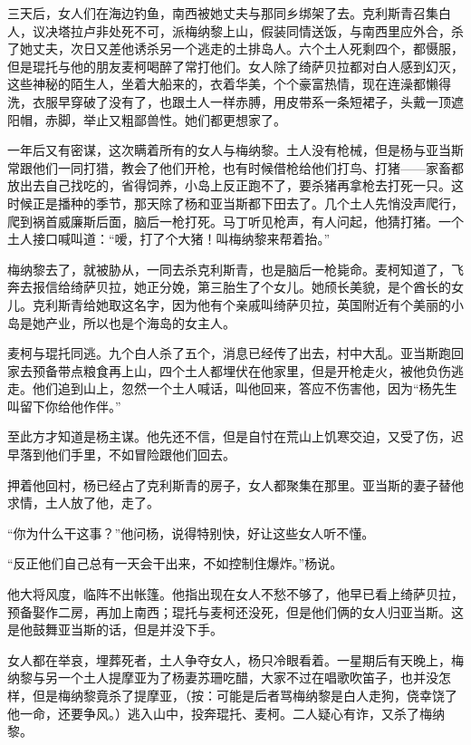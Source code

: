 \par 三天后，女人们在海边钓鱼，南西被她丈夫与那同乡绑架了去。克利斯青召集白人，议决塔拉卢非处死不可，派梅纳黎上山，假装同情送饭，与南西里应外合，杀了她丈夫，次日又差他诱杀另一个逃走的土排岛人。六个土人死剩四个，都慑服，但是琨托与他的朋友麦柯喝醉了常打他们。女人除了绮萨贝拉都对白人感到幻灭，这些神秘的陌生人，坐着大船来的，衣着华美，个个豪富热情，现在连澡都懒得洗，衣服早穿破了没有了，也跟土人一样赤膊，用皮带系一条短裙子，头戴一顶遮阳帽，赤脚，举止又粗鄙兽性。她们都更想家了。
\par 一年后又有密谋，这次瞒着所有的女人与梅纳黎。土人没有枪械，但是杨与亚当斯常跟他们一同打猎，教会了他们开枪，也有时候借枪给他们打鸟、打猪——家畜都放出去自己找吃的，省得饲养，小岛上反正跑不了，要杀猪再拿枪去打死一只。这时候正是播种的季节，那天除了杨和亚当斯都下田去了。几个土人先悄没声爬行，爬到祸首威廉斯后面，脑后一枪打死。马丁听见枪声，有人问起，他猜打猪。一个土人接口喊叫道：“嗳，打了个大猪！叫梅纳黎来帮着抬。”
\par 梅纳黎去了，就被胁从，一同去杀克利斯青，也是脑后一枪毙命。麦柯知道了，飞奔去报信给绮萨贝拉，她正分娩，第三胎生了个女儿。她颀长美貌，是个酋长的女儿。克利斯青给她取这名字，因为他有个亲戚叫绮萨贝拉，英国附近有个美丽的小岛是她产业，所以也是个海岛的女主人。
\par 麦柯与琨托同逃。九个白人杀了五个，消息已经传了出去，村中大乱。亚当斯跑回家去预备带点粮食再上山，四个土人都埋伏在他家里，但是开枪走火，被他负伤逃走。他们追到山上，忽然一个土人喊话，叫他回来，答应不伤害他，因为“杨先生叫留下你给他作伴。”
\par 至此方才知道是杨主谋。他先还不信，但是自忖在荒山上饥寒交迫，又受了伤，迟早落到他们手里，不如冒险跟他们回去。
\par 押着他回村，杨已经占了克利斯青的房子，女人都聚集在那里。亚当斯的妻子替他求情，土人放了他，走了。
\par “你为什么干这事？”他问杨，说得特别快，好让这些女人听不懂。
\par “反正他们自己总有一天会干出来，不如控制住爆炸。”杨说。
\par 他大将风度，临阵不出帐篷。他指出现在女人不愁不够了，他早已看上绮萨贝拉，预备娶作二房，再加上南西；琨托与麦柯还没死，但是他们俩的女人归亚当斯。这是他鼓舞亚当斯的话，但是并没下手。
\par 女人都在举哀，埋葬死者，土人争夺女人，杨只冷眼看着。一星期后有天晚上，梅纳黎与另一个土人提摩亚为了杨妻苏珊吃醋，大家不过在唱歌吹笛子，也并没怎样，但是梅纳黎竟杀了提摩亚，（按：可能是后者骂梅纳黎是白人走狗，侥幸饶了他一命，还要争风。）逃入山中，投奔琨托、麦柯。二人疑心有诈，又杀了梅纳黎。
